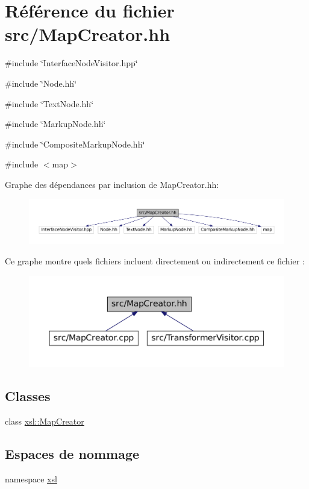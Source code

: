 \hypertarget{_map_creator_8hh}{
\section{Référence du fichier src/MapCreator.hh}
\label{_map_creator_8hh}
}
{\ttfamily \#include \char`\"{}InterfaceNodeVisitor.hpp\char`\"{}}\par
{\ttfamily \#include \char`\"{}Node.hh\char`\"{}}\par
{\ttfamily \#include \char`\"{}TextNode.hh\char`\"{}}\par
{\ttfamily \#include \char`\"{}MarkupNode.hh\char`\"{}}\par
{\ttfamily \#include \char`\"{}CompositeMarkupNode.hh\char`\"{}}\par
{\ttfamily \#include $<$map$>$}\par
Graphe des dépendances par inclusion de MapCreator.hh:
\nopagebreak
\begin{figure}[H]
\begin{center}
\leavevmode
\includegraphics[width=400pt]{_map_creator_8hh__incl}
\end{center}
\end{figure}
Ce graphe montre quels fichiers incluent directement ou indirectement ce fichier :
\nopagebreak
\begin{figure}[H]
\begin{center}
\leavevmode
\includegraphics[width=400pt]{_map_creator_8hh__dep__incl}
\end{center}
\end{figure}
\subsection*{Classes}
\begin{DoxyCompactItemize}
\item 
class \hyperlink{classxsl_1_1_map_creator}{xsl::MapCreator}
\end{DoxyCompactItemize}
\subsection*{Espaces de nommage}
\begin{DoxyCompactItemize}
\item 
namespace \hyperlink{namespacexsl}{xsl}
\end{DoxyCompactItemize}
